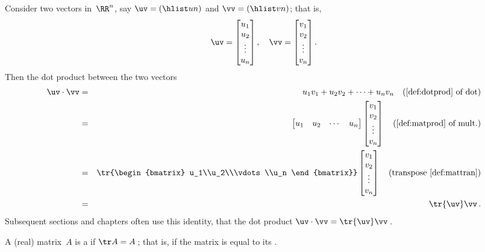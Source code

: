 \begin{example} \label{eg:trdp}
Consider two vectors in~\(\RR^n\), say \(\uv=(\hlist un)\) and \(\vv=(\hlist vn)\); that is,
\begin{equation*}
\uv=\begin{bmatrix} u_1\\u_2\\\vdots\\u_n \end{bmatrix},\quad
\vv=\begin{bmatrix} v_1\\v_2\\\vdots\\v_n \end{bmatrix}.
\end{equation*}
Then the dot product between the two vectors
\begin{eqnarray*}
\uv\cdot\vv&=&u_1v_1+u_2v_2+\cdots+u_nv_n \quad(\text{\cref{def:dotprod} of dot})
\\&=&\begin{bmatrix} u_1&u_2&\cdots&u_n \end{bmatrix}
\begin{bmatrix} v_1\\v_2\\\vdots\\v_n \end{bmatrix}\quad(\text{\cref{def:matprod} of mult.})
\\&=&\tr{\begin{bmatrix} u_1\\u_2\\\vdots\\u_n \end{bmatrix}}
\begin{bmatrix} v_1\\v_2\\\vdots\\v_n \end{bmatrix}\quad(\text{transpose \cref{def:mattran}})
\\&=&\tr{\uv}\vv\,.
\end{eqnarray*}
Subsequent sections and chapters often use this identity, that the dot product \(\uv\cdot\vv=\tr{\uv}\vv\)\,.
\end{example}


\begin{definition}[symmetry] \label{def:matsym}
A (real) matrix~\(A\) is a  if \(\tr A=A\)\,; that is, if the matrix is equal to its .
\end{definition}


